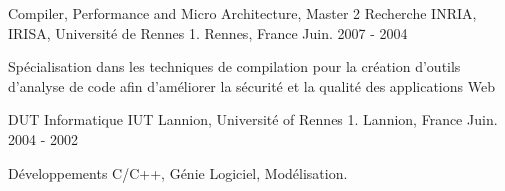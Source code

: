

\begin{cventries}

  \cventry
    {Compiler, Performance and Micro Architecture, Master 2 Recherche} %
    {INRIA, IRISA, Université de Rennes 1. } %
    {Rennes, France} %
    {Juin. 2007 - 2004} %
    {
      \begin{cvitems} %
        \item {Spécialisation dans les techniques de compilation pour la création d'outils d'analyse de code afin d'améliorer la sécurité et la qualité des applications Web }
      \end{cvitems}
    }
\cventry
{DUT Informatique} %
{IUT Lannion, Université of Rennes 1. } %
{Lannion, France} %
{Juin. 2004 - 2002} %
{
	\begin{cvitems} %
			\item { Développements C/C++, Génie Logiciel, Modélisation. }
	\end{cvitems}
}

\end{cventries}
